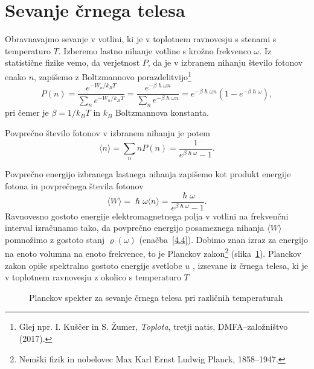 \section{Sevanje črnega telesa}
Obravnavajmo sevanje v votlini, ki je v toplotnem ravnovesju s stenami s temperaturo
$T$. Izberemo lastno nihanje votline s krožno frekvenco $\omega$. Iz statistične fizike 
vemo, da verjetnost $P$, da je v izbranem  nihanju število fotonov enako $n$, 
zapišemo z Boltzmannovo porazdelitvijo\footnote{Glej
npr. I. Kuščer in S. Žumer, {\it Toplota}, tretji natis, DMFA--založništvo (2017).}
\begin{equation}
P(n)=\frac{e^{-W_{n}/k_BT}}{\sum_{n}e^{-W_{n}/k_BT}} = 
\frac{e^{-\beta\hslash\omega n}}
{\sum_{n}e^{-\beta\hslash\omega n}}=
e^{-\beta\hslash\omega n}(1-e^{-\beta\hslash\omega}),
\label{4.12}
\end{equation}
pri čemer je $\beta = 1/k_BT$ in $k_B$ Boltzmannova konstanta. 

Povprečno število fotonov v izbranem nihanju je potem 
\begin{equation}
\langle n\rangle =\sum_{n}n P(n)=\frac{1}{e^{\beta\hslash\omega}-1}.
\label{4.13}
\end{equation}

Povprečno energijo izbranega lastnega nihanja zapišemo kot produkt energije fotona in 
povprečnega števila fotonov
\begin{equation}
\langle W\rangle = \hslash \omega \langle n \rangle
= \frac{\hslash \omega}{e^{\beta\hslash\omega}-1}.
\end{equation}
Ravnovesno gostoto energije elektromagnetnega polja v votlini na
frekvenčni interval izračunamo tako, da povprečno energijo posameznega
nihanja $\langle W \rangle$ pomnožimo z gostoto stanj $\varrho (\omega)$ 
(enačba~\ref{4.4}). Dobimo znan izraz za energijo na enoto volumna na enoto frekvence, 
to je Planckov zakon\footnote{Nemški fizik in nobelovec 
Max Karl Ernst Ludwig Planck, 1858--1947.} (slika~\ref{fig:Planck}).
Planckov zakon opiše spektralno gostoto energije svetlobe $u$ 
, izsevane iz 
črnega telesa, ki je v toplotnem ravnovesju z 
okolico s temperaturo $T$

\begin{figure}[h]
\centering
\def\svgwidth{100truemm} 

\caption{Planckov spekter za sevanje črnega telesa pri različnih temperaturah}
\label{fig:Planck}
\end{figure}

